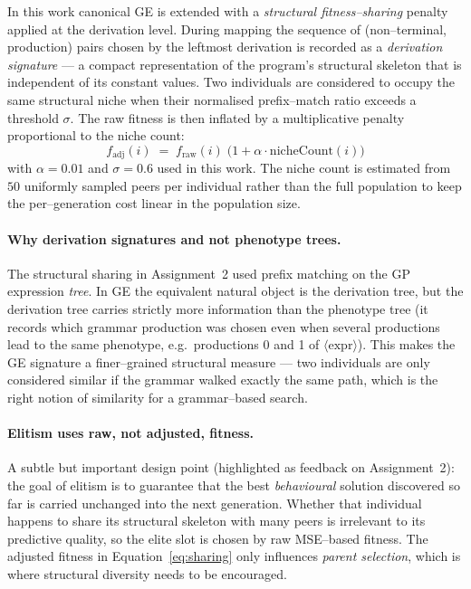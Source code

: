 \documentclass[12pt,a4paper]{article}
\begin{document}
In this work canonical GE is extended with a \emph{structural
fitness--sharing} penalty applied at the derivation level. During mapping
the sequence of (non--terminal, production) pairs chosen by the leftmost
derivation is recorded as a \emph{derivation signature} ---
a compact representation of the program's structural skeleton that is
independent of its constant values. Two individuals are considered to
occupy the same structural niche when their normalised prefix--match
ratio exceeds a threshold $\sigma$. The raw fitness is then inflated
by a multiplicative penalty proportional to the niche count:
\begin{equation}
f_{\text{adj}}(i) \;=\; f_{\text{raw}}(i) \;\bigl(1 + \alpha \cdot
\mathrm{nicheCount}(i)\bigr)
\label{eq:sharing}
\end{equation}
with $\alpha = 0.01$ and $\sigma = 0.6$ used in this work. The niche count
is estimated from $50$ uniformly sampled peers per individual rather than
the full population to keep the per--generation cost linear in the
population size.

\paragraph{Why derivation signatures and not phenotype trees.}
The structural sharing in Assignment~2 used prefix matching on the GP
expression \emph{tree}. In GE the equivalent natural object is the
derivation tree, but the derivation tree carries strictly more
information than the phenotype tree (it records which grammar
production was chosen even when several productions lead to the same
phenotype, e.g.\ productions 0 and 1 of $\langle\text{expr}\rangle$).
This makes the GE signature a finer--grained structural measure --- two
individuals are only considered similar if the grammar walked exactly
the same path, which is the right notion of similarity for a
grammar--based search.

\paragraph{Elitism uses raw, not adjusted, fitness.}
A subtle but important design point (highlighted as feedback on
Assignment~2): the goal of elitism is to guarantee that the best
\emph{behavioural} solution discovered so far is carried unchanged into
the next generation. Whether that individual happens to share its
structural skeleton with many peers is irrelevant to its predictive
quality, so the elite slot is chosen by raw MSE--based fitness. The
adjusted fitness in Equation~\ref{eq:sharing} only influences
\emph{parent selection}, which is where structural diversity needs to be
encouraged.
\end{document}
